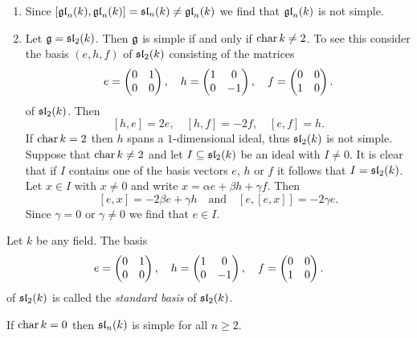 \begin{expls}
 \begin{enumerate}[leftmargin=*]
  \item
   Since $[\mathfrak{gl}_n(k),\mathfrak{gl}_n(k)] = \mathfrak{sl}_n(k) \neq \mathfrak{gl}_n(k)$ we find that $\mathfrak{gl}_n(k)$ is not simple.
  \item
   Let $\mathfrak{g} = \mathfrak{sl}_2(k)$. Then $\mathfrak{g}$ is simple if and only if $\operatorname{char} k \neq 2$. To see this consider the basis $(e,h,f)$ of $\mathfrak{sl}_2(k)$ consisting of the matrices
   \[
    e = \begin{pmatrix}0 & 1 \\ 0 & 0\end{pmatrix}, \quad
    h = \begin{pmatrix}1 & 0 \\ 0 & -1\end{pmatrix}, \quad
    f = \begin{pmatrix}0 & 0 \\ 1 & 0\end{pmatrix}.
   \]
   of $\mathfrak{sl}_2(k)$. Then
   \[
    [h,e] = 2e, \quad
    [h,f] = -2f, \quad
    [e,f] = h.
   \]
   If $\operatorname{char} k = 2$ then $h$ spans a $1$-dimensional ideal, thus $\mathfrak{sl}_2(k)$ is not simple. Suppose that $\operatorname{char} k \neq 2$ and let $I \subseteq \mathfrak{sl}_2(k)$ be an ideal with $I \neq 0$. It is clear that if $I$ contains one of the basis vectors $e$, $h$ or $f$ it follows that $I = \mathfrak{sl}_2(k)$. Let $x \in I$ with $x \neq 0$ and write $x = \alpha e + \beta h + \gamma f$. Then
   \[
    [e,x] = -2 \beta e + \gamma h \quad \text{and} \quad [e,[e,x]] = -2 \gamma e.
   \]
   Since $\gamma = 0$ or $\gamma \neq 0$ we find that $e \in I$.
 \end{enumerate}
\end{expls}


\begin{defi}
 Let $k$ be any field. The basis
 \[
  e = \begin{pmatrix}0 & 1 \\ 0 & 0\end{pmatrix}, \quad
  h = \begin{pmatrix}1 & 0 \\ 0 & -1\end{pmatrix}, \quad
  f = \begin{pmatrix}0 & 0 \\ 1 & 0\end{pmatrix}.
 \]
 of $\mathfrak{sl}_2(k)$ is called the \emph{standard basis} of $\mathfrak{sl}_2(k)$.
\end{defi}


\begin{rem}
 If $\operatorname{char} k = 0$ then $\mathfrak{sl}_n(k)$ is simple for all $n \geq 2$.
\end{rem}